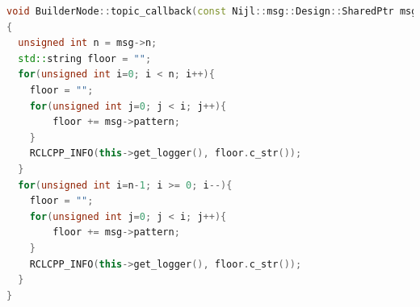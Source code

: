 \begin{exercise}
\begin{minipage}{0.9\linewidth}
\begin{lstlisting}[language=C++, firstnumber=0]
void BuilderNode::topic_callback(const Nijl::msg::Design::SharedPtr msg) const
{
  unsigned int n = msg->n;
  std::string floor = "";
  for(unsigned int i=0; i < n; i++){
    floor = "";
    for(unsigned int j=0; j < i; j++){
        floor += msg->pattern;
    }
    RCLCPP_INFO(this->get_logger(), floor.c_str());
  }
  for(unsigned int i=n-1; i >= 0; i--){
    floor = "";
    for(unsigned int j=0; j < i; j++){
        floor += msg->pattern;
    }
    RCLCPP_INFO(this->get_logger(), floor.c_str());
  }
}
\end{lstlisting}
\end{minipage}
\end{exercise}
\newpage

